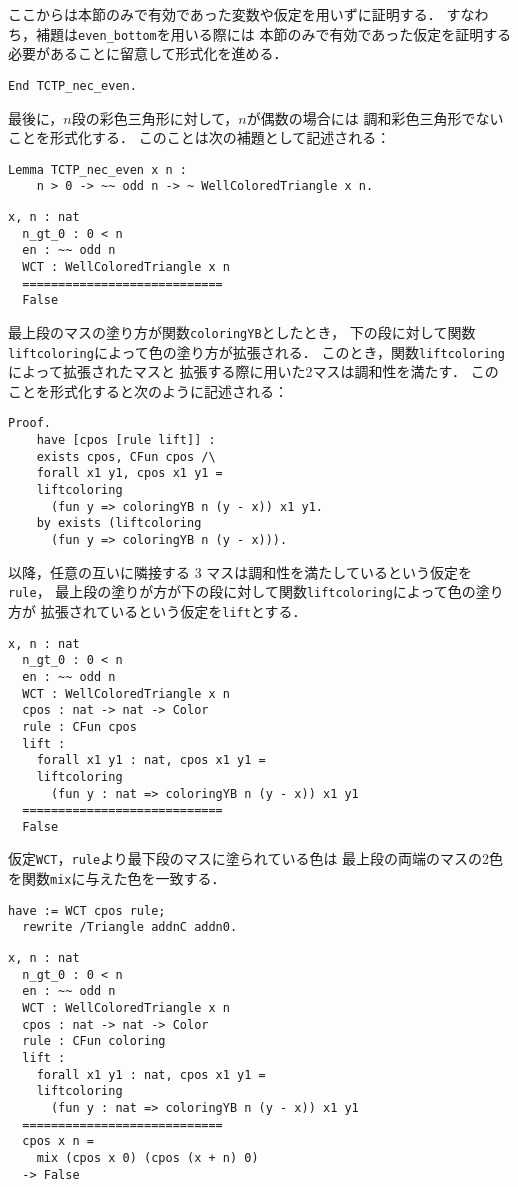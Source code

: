 ここからは本節のみで有効であった変数や仮定を用いずに証明する．
すなわち，補題は{\tt{even\_bottom}}を用いる際には
本節のみで有効であった仮定を証明する必要があることに留意して形式化を進める．
\begin{lstlisting}[language=Coq]
  End TCTP_nec_even.
\end{lstlisting}

最後に，$n$段の彩色三角形に対して，$n$が偶数の場合には
調和彩色三角形でないことを形式化する．
このことは次の補題として記述される：
\begin{lstlisting}[language=Coq]
  Lemma TCTP_nec_even x n :
    n > 0 -> ~~ odd n -> ~ WellColoredTriangle x n.
\end{lstlisting}
\begin{lstlisting}[language=Coq]
  x, n : nat
  n_gt_0 : 0 < n
  en : ~~ odd n
  WCT : WellColoredTriangle x n
  ============================
  False
\end{lstlisting}
最上段のマスの塗り方が関数{\tt{coloringYB}}としたとき，
下の段に対して関数{\tt{liftcoloring}}によって色の塗り方が拡張される．
このとき，関数{\tt{liftcoloring}}によって拡張されたマスと
拡張する際に用いた2マスは調和性を満たす．
このことを形式化すると次のように記述される：
\begin{lstlisting}[language=Coq]
  Proof.
    have [cpos [rule lift]] :
    exists cpos, CFun cpos /\
    forall x1 y1, cpos x1 y1 =
    liftcoloring
      (fun y => coloringYB n (y - x)) x1 y1.
    by exists (liftcoloring
      (fun y => coloringYB n (y - x))).
\end{lstlisting}
以降，任意の互いに隣接する 3 マスは調和性を満たしているという仮定を{\tt{rule}}，
最上段の塗りが方が下の段に対して関数{\tt{liftcoloring}}によって色の塗り方が
拡張されているという仮定を{\tt{lift}}とする．
\begin{lstlisting}[language=Coq]
  x, n : nat
  n_gt_0 : 0 < n
  en : ~~ odd n
  WCT : WellColoredTriangle x n
  cpos : nat -> nat -> Color
  rule : CFun cpos
  lift :
    forall x1 y1 : nat, cpos x1 y1 =
    liftcoloring
      (fun y : nat => coloringYB n (y - x)) x1 y1
  ============================
  False
\end{lstlisting}
仮定{\tt{WCT}}，{\tt{rule}}より最下段のマスに塗られている色は
最上段の両端のマスの2色を関数{\tt{mix}}に与えた色を一致する．
\begin{lstlisting}[language=Coq]
  have := WCT cpos rule;
  rewrite /Triangle addnC addn0.
\end{lstlisting}
\begin{lstlisting}[language=Coq]
  x, n : nat
  n_gt_0 : 0 < n
  en : ~~ odd n
  WCT : WellColoredTriangle x n
  cpos : nat -> nat -> Color
  rule : CFun coloring
  lift :
    forall x1 y1 : nat, cpos x1 y1 =
    liftcoloring
      (fun y : nat => coloringYB n (y - x)) x1 y1
  ============================
  cpos x n =
    mix (cpos x 0) (cpos (x + n) 0)
  -> False
\end{lstlisting}
